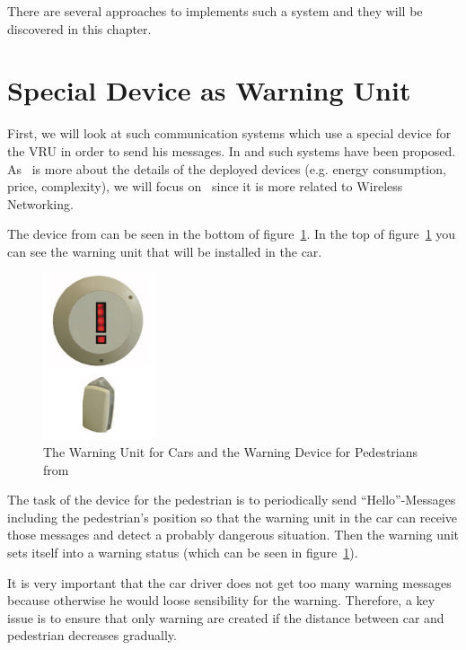 \documentclass[]{ccs-thesis}
\begin{document}
There are several approaches to implements such a system and they will be discovered in this chapter.

\section{Special Device as Warning Unit}\label{sec:special device}

First, we will look at such communication systems which use a special device for the \ac{VRU} in order to send his messages. In \cite{v2pprotection} and \cite{watchover} such systems have been proposed. As~\cite{watchover} is more about the details of the deployed devices (e.g. energy consumption, price, complexity), we will focus on~\cite{v2pprotection} since it is more related to Wireless Networking.

The device from \cite{v2pprotection} can be seen in the bottom of figure~\ref{fig:device}. In the top of figure~\ref{fig:device} you can see the warning unit that will be installed in the car.

\begin{figure}[h]
	\centering
	\includegraphics[width=0.3\textwidth]{figures/1_device}
	\caption{The Warning Unit for Cars and the Warning Device for Pedestrians from \cite{v2pprotection}}%
	\label{fig:device}%
\end{figure}

The task of the device for the pedestrian is to periodically send \enquote{Hello}-Messages including the pedestrian's position so that the warning unit in the car can receive those messages and detect a probably dangerous situation. Then the warning unit sets itself into a warning status (which can be seen in figure~\ref{fig:device}).

It is very important that the car driver does not get too many warning messages because otherwise he would loose sensibility for the warning. Therefore, a key issue is to ensure that only warning are created if the distance between car and pedestrian decreases gradually.
\end{document}

